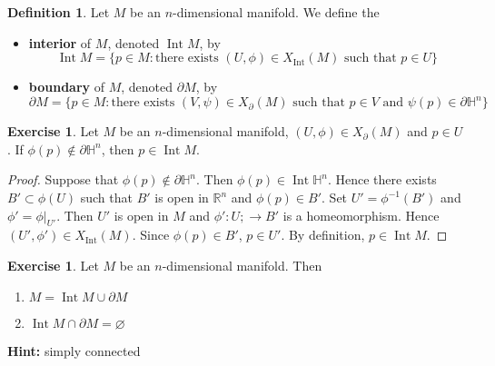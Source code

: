 \documentclass[12pt]{amsart}
\theoremstyle{definition}
\newtheorem{defn}[definition]{Definition}
\newtheorem{ex}[definition]{Exercise}
\renewcommand{\H}{\mathbb{H}}
\newcommand{\R}{\mathbb{R}}
\newcommand{\p}{\partial}
\DeclareMathOperator{\Int}{Int}
\begin{document}
	\begin{defn} Let $M$ be an $n$-dimensional manifold. We define the
		\begin{itemize}
			\item \textbf{interior} of $M$, denoted $\Int M$, by 
			$$\Int M = \{p \in M: \text{there exists $(U, \phi) \in X_{\Int}(M)$ such that $p \in U$}\}$$
			\item \textbf{boundary} of $M$, denoted $\p M$, by 
			$$\p M = \{p \in M: \text{there exists $(V, \psi) \in X_{\p}(M)$ such that $p \in V$ and $\psi(p) \in \p \H^n$}\}$$
		\end{itemize}
	\end{defn}

	\begin{ex}
		Let $M$ be an $n$-dimensional manifold, $(U, \phi) \in X_{\p}(M)$ and $p \in U$. If $\phi(p) \not \in \p \H^n$, then $p \in \Int M$.
	\end{ex}

	\begin{proof}
		Suppose that $\phi(p) \not \in \p \H^n$.  Then  $\phi(p) \in \Int \H^n$. Hence there exists $B' \subset \phi(U)$ such that $B'$ is open in $\R^n$ and $\phi(p) \in B'$. Set $U' = \phi^{-1}(B')$ and $\phi' = \phi|_{U'}$. Then $U'$ is open in $M$ and $\phi': U; \rightarrow B'$ is a homeomorphism. Hence $(U', \phi') \in X_{\Int}(M)$. Since $\phi(p) \in B'$, $p \in U'$. By definition, $p \in \Int M$.
	\end{proof}

	\begin{ex}
		Let $M$ be an $n$-dimensional manifold. Then 
		\begin{enumerate}
			\item $M = \Int M \cup \p M $
			\item $\Int M \cap \p M = \varnothing$
		\end{enumerate}
		\textbf{Hint:} simply connected
	\end{ex}
\end{document}
